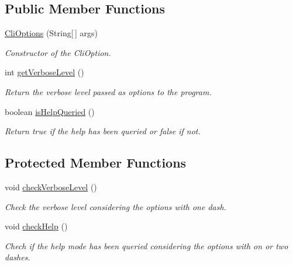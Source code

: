 \subsection*{Public Member Functions}
\begin{DoxyCompactItemize}
\item 
\hyperlink{classdebug_1_1_cli_options_ae5dfa0d3322f2d74bc44c6cccaf931e4}{Cli\-Options} (String\mbox{[}$\,$\mbox{]} args)
\begin{DoxyCompactList}\small\item\em Constructor of the Cli\-Option. \end{DoxyCompactList}\item 
int \hyperlink{classdebug_1_1_cli_options_a7b9655bcabe2969db66c0c5dab5487b8}{get\-Verbose\-Level} ()
\begin{DoxyCompactList}\small\item\em Return the verbose level passed as options to the program. \end{DoxyCompactList}\item 
boolean \hyperlink{classdebug_1_1_cli_options_a34dabb4bbc667b0f56bf210749c260bf}{is\-Help\-Queried} ()
\begin{DoxyCompactList}\small\item\em Return true if the help has been queried or false if not. \end{DoxyCompactList}\end{DoxyCompactItemize}
\subsection*{Protected Member Functions}
\begin{DoxyCompactItemize}
\item 
void \hyperlink{classdebug_1_1_cli_options_af9e27c7e2ce04aa2b9cfb42ac35db767}{check\-Verbose\-Level} ()
\begin{DoxyCompactList}\small\item\em Check the verbose level considering the options with one dash. \end{DoxyCompactList}\item 
void \hyperlink{classdebug_1_1_cli_options_ab0a2db9986b5ae6ac696e9a5e596eff1}{check\-Help} ()
\begin{DoxyCompactList}\small\item\em Chech if the help mode has been queried considering the options with on or two dashes. \end{DoxyCompactList}\end{DoxyCompactItemize}
